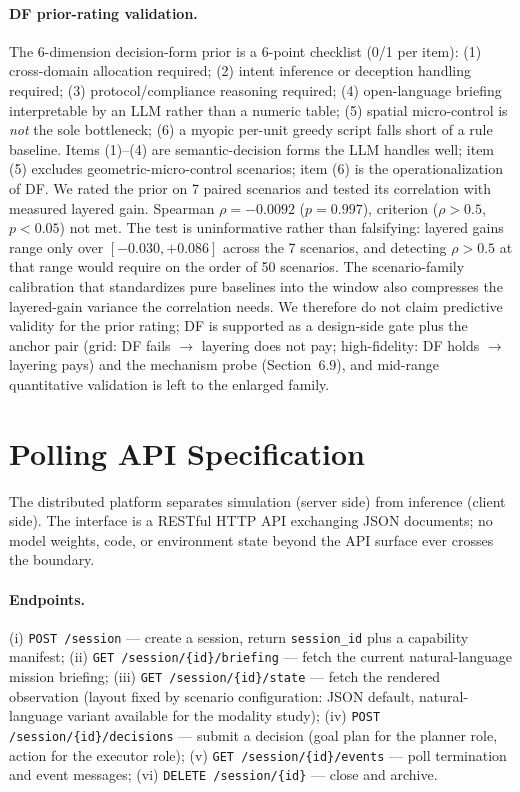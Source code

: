 \documentclass[sigconf,anonymous]{aamas}
\begin{document}
\paragraph{DF prior-rating validation.}
The 6-dimension decision-form prior is a 6-point checklist (0/1 per item): (1) cross-domain allocation required; (2) intent inference or deception handling required; (3) protocol/compliance reasoning required; (4) open-language briefing interpretable by an LLM rather than a numeric table; (5) spatial micro-control is \emph{not} the sole bottleneck; (6) a myopic per-unit greedy script falls short of a rule baseline. Items (1)--(4) are semantic-decision forms the LLM handles well; item (5) excludes geometric-micro-control scenarios; item (6) is the operationalization of DF. We rated the prior on 7 paired scenarios and tested its correlation with measured layered gain. Spearman $\rho = -0.0092$ ($p = 0.997$), criterion ($\rho > 0.5$, $p < 0.05$) not met. The test is uninformative rather than falsifying: layered gains range only over $[-0.030, +0.086]$ across the 7 scenarios, and detecting $\rho > 0.5$ at that range would require on the order of 50 scenarios. The scenario-family calibration that standardizes pure baselines into the window also compresses the layered-gain variance the correlation needs. We therefore do not claim predictive validity for the prior rating; DF is supported as a design-side gate plus the anchor pair (grid: DF fails $\rightarrow$ layering does not pay; high-fidelity: DF holds $\rightarrow$ layering pays) and the mechanism probe (Section~6.9), and mid-range quantitative validation is left to the enlarged family.

\section{Polling API Specification}\label{app:B}

The distributed platform separates simulation (server side) from inference (client side). The interface is a RESTful HTTP API exchanging JSON documents; no model weights, code, or environment state beyond the API surface ever crosses the boundary.

\paragraph{Endpoints.}
(i) \texttt{POST /session} --- create a session, return \texttt{session\_id} plus a capability manifest; (ii) \texttt{GET /session/\{id\}/briefing} --- fetch the current natural-language mission briefing; (iii) \texttt{GET /session/\{id\}/state} --- fetch the rendered observation (layout fixed by scenario configuration: JSON default, natural-language variant available for the modality study); (iv) \texttt{POST /session/\{id\}/decisions} --- submit a decision (goal plan for the planner role, action for the executor role); (v) \texttt{GET /session/\{id\}/events} --- poll termination and event messages; (vi) \texttt{DELETE /session/\{id\}} --- close and archive.
\end{document}
